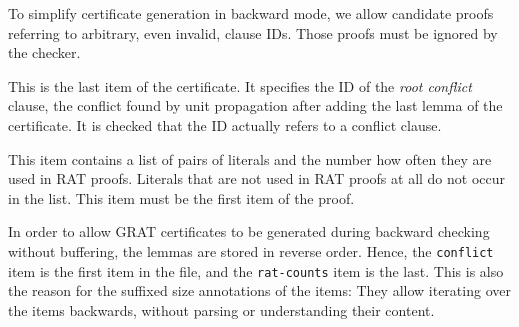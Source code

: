 \documentclass{llncs}
\newcommand{\lsti}{\lstinline[language={},literate={}]}
\begin{document}
\begin{description}
      To simplify certificate generation in backward mode, we allow candidate proofs referring to arbitrary, even invalid, clause IDs. Those proofs must be ignored by the checker.
    \item[conflict] This is the last item of the certificate. It specifies the ID of the \emph{root conflict} clause, \ie the conflict found by unit propagation after adding the last 
    lemma of the certificate. It is checked that the ID actually refers to a conflict clause.
    
    \item[rat-counts] This item contains a list of pairs of literals and the number how often they are used in RAT proofs. 
      Literals that are not used in RAT proofs at all do not occur in the list. This item must be the first item of the proof. 
\end{description}
In order to allow GRAT certificates to be generated during backward checking without buffering, the lemmas are stored in reverse order.
Hence, the \lsti{conflict} item is the first item in the file, and the \lsti{rat-counts} item is the last.
This is also the reason for the suffixed size annotations of the items: They allow iterating over the items backwards, without parsing or understanding their content.
\end{document}
